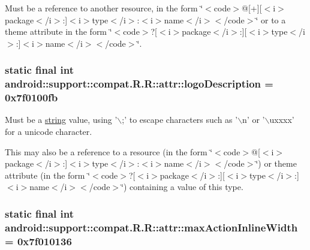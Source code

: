 Must be a reference to another resource, in the form \char`\"{}$<$code$>$@\mbox{[}+\mbox{]}\mbox{[}$<$i$>$package$<$/i$>$:\mbox{]}$<$i$>$type$<$/i$>$:$<$i$>$name$<$/i$>$$<$/code$>$\char`\"{} or to a theme attribute in the form \char`\"{}$<$code$>$?\mbox{[}$<$i$>$package$<$/i$>$:\mbox{]}\mbox{[}$<$i$>$type$<$/i$>$:\mbox{]}$<$i$>$name$<$/i$>$$<$/code$>$\char`\"{}. \hypertarget{classandroid_1_1support_1_1compat_1_1_r_1_1attr_b626553f155f13b243339d7594f5c3dd}{
\subsubsection[{logoDescription}]{\setlength{\rightskip}{0pt plus 5cm}static final int android::support::compat.R.R::attr::logoDescription = 0x7f0100fb}}
\label{classandroid_1_1support_1_1compat_1_1_r_1_1attr_b626553f155f13b243339d7594f5c3dd}


Must be a \hyperlink{classandroid_1_1support_1_1compat_1_1_r_1_1string}{string} value, using '$\backslash$;' to escape characters such as '$\backslash$n' or '$\backslash$uxxxx' for a unicode character. 

This may also be a reference to a resource (in the form \char`\"{}$<$code$>$@\mbox{[}$<$i$>$package$<$/i$>$:\mbox{]}$<$i$>$type$<$/i$>$:$<$i$>$name$<$/i$>$$<$/code$>$\char`\"{}) or theme attribute (in the form \char`\"{}$<$code$>$?\mbox{[}$<$i$>$package$<$/i$>$:\mbox{]}\mbox{[}$<$i$>$type$<$/i$>$:\mbox{]}$<$i$>$name$<$/i$>$$<$/code$>$\char`\"{}) containing a value of this type. \hypertarget{classandroid_1_1support_1_1compat_1_1_r_1_1attr_d6dcc76c447f84f6ec7dc3d67493b2c9}{
\subsubsection[{maxActionInlineWidth}]{\setlength{\rightskip}{0pt plus 5cm}static final int android::support::compat.R.R::attr::maxActionInlineWidth = 0x7f010136}}
\label{classandroid_1_1support_1_1compat_1_1_r_1_1attr_d6dcc76c447f84f6ec7dc3d67493b2c9}


